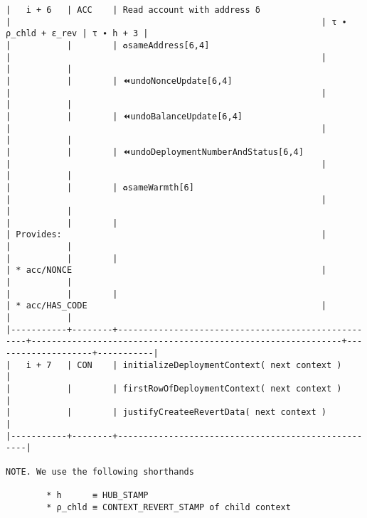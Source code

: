 \documentclass[varwidth=\maxdimen,margin=0.5cm,multi={verbatim}]{standalone}
\begin{document}
\begin{verbatim}
|   i + 6   | ACC    | Read account with address δ                        |                                                             | τ ∙ ρ_chld + ε_rev | τ ∙ h + 3 |
|           |        | ♻️sameAddress[6,4]                                  |                                                             |                    |           |
|           |        | ⏪undoNonceUpdate[6,4]                             |                                                             |                    |           |
|           |        | ⏪undoBalanceUpdate[6,4]                           |                                                             |                    |           |
|           |        | ⏪undoDeploymentNumberAndStatus[6,4]               |                                                             |                    |           |
|           |        | ♻️sameWarmth[6]                                     |                                                             |                    |           |
|           |        |                                                    | Provides:                                                   |                    |           |
|           |        |                                                    | * acc/NONCE                                                 |                    |           |
|           |        |                                                    | * acc/HAS_CODE                                              |                    |           |
|-----------+--------+----------------------------------------------------+-------------------------------------------------------------+--------------------+-----------|
|   i + 7   | CON    | initializeDeploymentContext( next context )        |
|           |        | firstRowOfDeploymentContext( next context )        |
|           |        | justifyCreateeRevertData( next context )           |
|-----------+--------+----------------------------------------------------|

NOTE. We use the following shorthands

        * h      ≡ HUB_STAMP
        * ρ_chld ≡ CONTEXT_REVERT_STAMP of child context

\end{verbatim}
\end{document}
